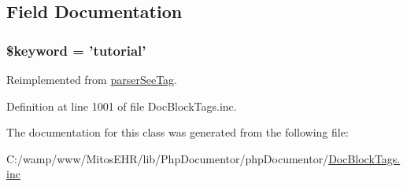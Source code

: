 \subsection{\-Field \-Documentation}
\hypertarget{classparser_tutorial_tag_a4a925d6b38bcf3957c713a7d3dc7da1f}{
\subsubsection[{\$keyword}]{\setlength{\rightskip}{0pt plus 5cm}\$keyword = 'tutorial'}}\label{classparser_tutorial_tag_a4a925d6b38bcf3957c713a7d3dc7da1f}


\-Reimplemented from \hyperlink{classparser_see_tag_a4a925d6b38bcf3957c713a7d3dc7da1f}{parser\-See\-Tag}.



\-Definition at line 1001 of file \-Doc\-Block\-Tags.\-inc.



\-The documentation for this class was generated from the following file\-:\begin{DoxyCompactItemize}
\item 
\-C\-:/wamp/www/\-Mitos\-E\-H\-R/lib/\-Php\-Documentor/php\-Documentor/\hyperlink{_doc_block_tags_8inc}{\-Doc\-Block\-Tags.\-inc}\end{DoxyCompactItemize}
